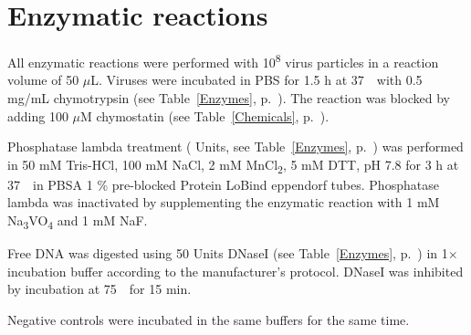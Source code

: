 
\section{Enzymatic reactions}
 
All enzymatic reactions were performed with 10\textsuperscript{8} virus particles in a reaction volume of 50 $\mu$L. Viruses were incubated in PBS for 1.5 h at 37~\textcelsius~with 0.5 mg/mL chymotrypsin (see Table~\ref{Enzymes}, p.~\pageref{Enzymes}). The reaction was blocked by adding 100 $\mu$M chymostatin (see Table~\ref{Chemicals}, p.~\pageref{Chemicals}). 

Phosphatase lambda treatment ( Units, see Table~\ref{Enzymes}, p.~\pageref{Enzymes}) was performed in 50 mM Tris-HCl, 100 mM NaCl, 2 mM MnCl\textsubscript{2}, 5 mM DTT, pH 7.8 for 3 h at 37~\textcelsius~in PBSA 1 \% pre-blocked Protein LoBind eppendorf tubes. Phosphatase lambda was inactivated by supplementing the enzymatic reaction with 1 mM Na\textsubscript{3}VO\textsubscript{4} and 1 mM NaF. 

Free DNA was digested using 50 Units DNaseI (see Table~\ref{Enzymes}, p.~\pageref{Enzymes}) in 1$\times$ incubation buffer according to the manufacturer’s protocol. DNaseI was inhibited by incubation at 75~\textcelsius~for 15 min. 

Negative controls were incubated in the same buffers for the same time.





